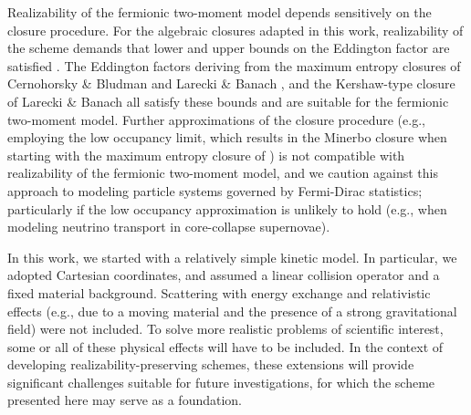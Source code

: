 Realizability of the fermionic two-moment model depends sensitively on the closure procedure.  
For the algebraic closures adapted in this work, realizability of the scheme demands that lower and upper bounds on the Eddington factor are satisfied \cite{levermore_1984,lareckiBanach_2011}.  
The Eddington factors deriving from the maximum entropy closures of Cernohorsky \& Bludman \cite{cernohorskyBludman_1994} and Larecki \& Banach \cite{lareckiBanach_2011}, and the Kershaw-type closure of Larecki \& Banach \cite{banachLarecki_2017a} all satisfy these bounds and are suitable for the fermionic two-moment model.  
Further approximations of the closure procedure (e.g., employing the low occupancy limit, which results in the Minerbo closure \cite{minerbo_1978} when starting with the maximum entropy closure of \cite{cernohorskyBludman_1994}) is not compatible with realizability of the fermionic two-moment model, and we caution against this approach to modeling particle systems governed by Fermi-Dirac statistics; particularly if the low occupancy approximation is unlikely to hold (e.g., when modeling neutrino transport in core-collapse supernovae).  

In this work, we started with a relatively simple kinetic model.  
In particular, we adopted Cartesian coordinates, and assumed a linear collision operator and a fixed material background.  
Scattering with energy exchange and relativistic effects (e.g., due to a moving material and the presence of a strong gravitational field) were not included.  
To solve more realistic problems of scientific interest, some or all of these physical effects will have to be included.  
In the context of developing realizability-preserving schemes, these extensions will provide significant challenges suitable for future investigations, for which the scheme presented here may serve as a foundation.  